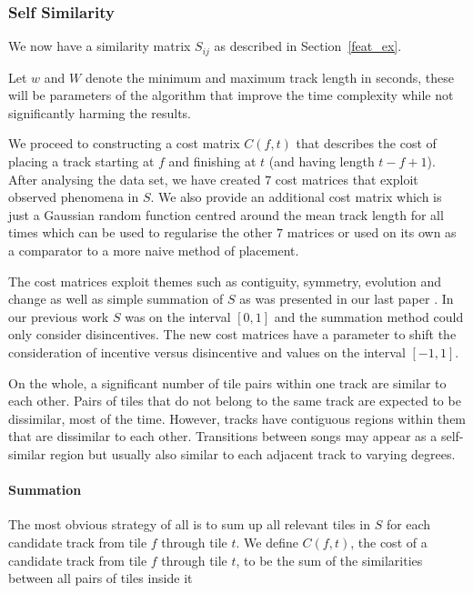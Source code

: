 \documentclass[twocolumn]{article}
\begin{document}
	\subsubsection{Self Similarity}\label{costmatrix_sec} %
	
	We now have a similarity matrix $S_{ij}$ as described in Section~\ref{feat_ex}. 
	
	Let $w$ and $W$ denote the minimum and maximum track length in seconds, these will be parameters of the algorithm that improve the time complexity while not significantly harming the results. 
	
We proceed to constructing a cost matrix $C(f,t)$ that describes the
cost of placing a track starting at $f$ and finishing at $t$ (and
having length $t-f+1$). After analysing the data set, we have created
$7$ cost matrices that exploit observed phenomena in $S$. We also
provide an additional cost matrix which is just a Gaussian random
function centred around the mean track length for all times which can
be used to regularise the other $7$ matrices or used on its own as a
comparator to a more naive method of placement.
	
	The cost matrices exploit themes such as contiguity, symmetry, evolution and change as well as simple summation of $S$ as was presented in our last paper \citep{scarfe2013long}. In our previous work $S$ was on the interval $[0,1]$ and the summation method could only consider disincentives. The new cost matrices have a parameter to shift the consideration of incentive versus disincentive and values on the interval $[-1,1]$.
	
	On the whole, a significant number of tile pairs within one track are similar to each other. Pairs of tiles that do not belong to the same track are expected to be dissimilar, most of the time. However, tracks have contiguous regions within them that are dissimilar to each other. Transitions between songs may appear as a self-similar region but usually also similar to each adjacent track to varying degrees.  
	
	\paragraph{Summation}
	
	The most obvious strategy of all is to sum up all relevant tiles in $S$ for each candidate track from tile $f$ through tile $t$. We define $C(f,t)$, the cost of a candidate track from tile $f$ through tile $t$, to be the sum of the similarities between all pairs of tiles inside it
\end{document}
